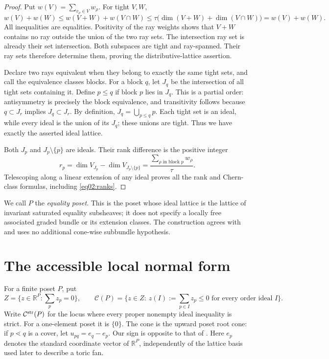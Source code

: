 \documentclass[11pt]{amsart}
\theoremstyle{definition}
\theoremstyle{remark}
\newcommand{\RR}{\mathbb R}
\newcommand{\cC}{\mathcal C}
\begin{document}
\begin{proof}
Put \(w(V)=\sum_{v_\rho\in V}w_\rho\). For tight \(V,W\),
\[
 w(V)+w(W)\le w(V+W)+w(V\cap W)
 \le\tau\bigl(\dim(V+W)+\dim(V\cap W)\bigr)
 =w(V)+w(W).
\]
All inequalities are equalities. Positivity of the ray weights shows
that \(V+W\) contains no ray outside the union of the two ray sets.
The intersection ray set is already their set intersection.
Both subspaces are tight and ray-spanned. Their ray sets therefore
determine them, proving the distributive-lattice assertion.

Declare two rays equivalent when they belong to exactly the same
tight sets, and call the equivalence classes blocks. For a block
\(q\), let \(J_q\) be the intersection of all tight sets containing
it. Define \(p\le q\) if block \(p\) lies in \(J_q\).
This is a partial order: antisymmetry is precisely the block
equivalence, and transitivity follows because \(q\subset J_r\)
implies \(J_q\subset J_r\). By definition,
\(J_q=\bigcup_{p\le q}p\). Each tight set is an ideal, while every ideal is the
union of its \(J_q\); these unions are tight. Thus we have exactly
the asserted ideal lattice.

Both \(J_p\) and \(J_p\setminus\{p\}\) are ideals. Their rank
difference is the positive integer
\[
 r_p=\dim V_{J_p}-\dim V_{J_p\setminus\{p\}}
     =\frac{\sum_{\rho\text{ in block }p}w_\rho}{\tau}.
\]
Telescoping along a linear extension of any ideal proves all the
rank and Chern-class formulas, including \eqref{eq02:ranks}.
\end{proof}

We call \(P\) the \emph{equality poset}. This is the poset whose ideal
lattice is the lattice of invariant saturated equality subsheaves;
it does not specify a locally free associated graded bundle or its
extension classes. The construction agrees with
\cite[\S3]{wuebben2026toricchambers} and uses no additional
cone-wise subbundle hypothesis.

\section{The accessible local normal form}\label{sec03:normal}

For a finite poset \(P\), put
\begin{equation}\label{eq03:root}
 Z=\{z\in\RR^P:\sum_pz_p=0\},\qquad
 \cC(P)=\{z\in Z:\ z(I):=\sum_{p\in I}z_p\le0
                       \text{ for every order ideal }I\}.
\end{equation}
Write \(\cC^{\rm str}(P)\) for the locus where every proper nonempty
ideal inequality is strict. For a one-element poset it is \(\{0\}\).
The cone is the upward poset root cone: if \(p\lessdot q\) is a
cover, let \(u_{pq}=e_q-e_p\). Our sign is opposite to that of
\cite[\S5]{boussicaultferaylascouxreiner2012}.
Here \(e_p\) denotes the standard coordinate vector of \(\RR^P\),
independently of the lattice basis used later to describe a toric fan.
\end{document}
